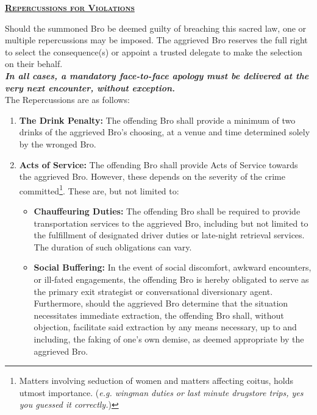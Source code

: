 \label{Article1-Repercussions}\lettrine{}{\underline{\textbf{\large{Repercussions for Violations}}}}\vspace{5pt}

Should the summoned Bro be deemed guilty of breaching this sacred law, one or multiple repercussions may be imposed. The aggrieved Bro reserves the full right to select the consequence(s) or appoint a trusted delegate to make the selection on their behalf. 
\\

\textbf{\textit{In all cases, a mandatory face-to-face apology must be delivered at the very next encounter, without exception.}}\\

\noindent
The Repercussions are as follows:
\begin{enumerate}
    \item \textbf{The Drink Penalty:}
    The offending Bro shall provide a minimum of two drinks of the aggrieved Bro’s choosing, at a venue and time determined solely by the wronged Bro.

    \item \textbf{Acts of Service:}
    The offending Bro shall provide Acts of Service towards the aggrieved Bro. However, these depends on the severity of the crime committed\footnote{Matters involving seduction of women and matters affecting coitus, holds utmost importance. (\textit{e.g. wingman duties or last minute drugstore trips, yes you guessed it correctly.})}. These are, but not limited to:
    \begin{itemize}
        \item \textbf{Chauffeuring Duties:}
        The offending Bro shall be required to provide transportation services to the aggrieved Bro, including but not limited to the fulfillment of designated driver duties or late-night retrieval services. The duration of such obligations can vary.

        \item \textbf{Social Buffering:}
        In the event of social discomfort, awkward encounters, or ill-fated engagements, the offending Bro is hereby obligated to serve as the primary exit strategist or conversational diversionary agent. Furthermore, should the aggrieved Bro determine that the situation necessitates immediate extraction, the offending Bro shall, without objection, facilitate said extraction by any means necessary, up to and including, the faking of one’s own demise, as deemed appropriate by the aggrieved Bro.
    \end{itemize}


\end{enumerate}
